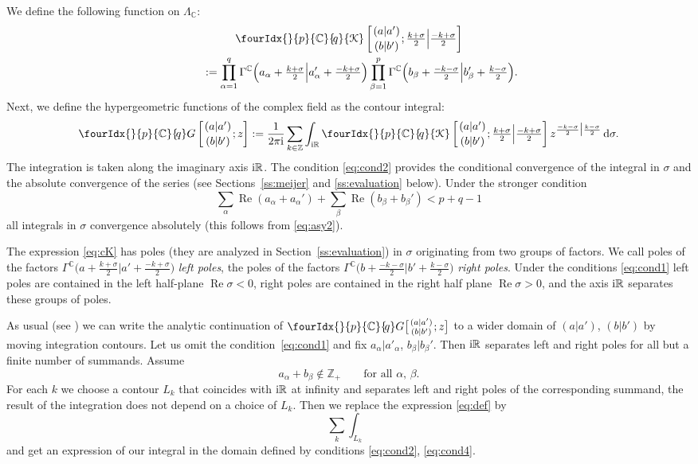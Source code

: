 \documentclass[pdftex]{sigma}
\numberwithin{equation}{section}
\renewcommand{\Re}{\mathop {\mathrm {Re}}\nolimits}
\newcommand{\Kc}[2]{\fourIdx{}{#1}{\C}{\!#2}{\EuScript K}}
\newcommand{\Gc}[2]{\fourIdx{}{#1}{\C}{\!#2}G}
\renewcommand{\Re}{\mathop {\mathrm {Re}}\nolimits}
\def\R {{\mathbb R }}
\def\C {{\mathbb C }}
\def\Z{{\mathbb Z}}
\begin{document}
We define the following function on $\Lambda_\C$:
\begin{gather}
\Kc{p}{q}\left[\genfrac{}{}{0pt}{}{(a|a')}{(b|b')};  \tfrac{k+\sigma}{2}\Bigl| \tfrac{-k+\sigma}{2}
\right]\nonumber\\
\qquad{} :=
 \prod_{\alpha=1}^q \Gamma^\C\Bigl(a_\alpha+\tfrac{k+\sigma}2\Bigl|a_\alpha'+\tfrac{-k+\sigma}2\Bigr)
 \prod_{\beta=1}^p \Gamma^\C\Bigl(b_\beta+\tfrac{-k-\sigma}2\Bigl|b_\beta'+\tfrac{k-\sigma}2\Bigr).
\label{eq:cK}
\end{gather}
Next, we define the hypergeometric functions of the complex field
as the contour integral:
\begin{equation}
\Gc{p}{q}\left[\genfrac{}{}{0pt}{}{(a|a')}{(b|b')};z\right]
:=\frac{1}{2\pi {\rm i}}
\sum_{k\in\Z} \int_{{\rm i}\R}
\Kc{p}{q}\left[\genfrac{}{}{0pt}{}{(a|a')}{(b|b')};\tfrac{k+\sigma}{2}\Bigl| \tfrac{-k+\sigma}{2}\right]
 z^{\frac{-k-\sigma}2\big| \frac{k-\sigma}2} \,{\rm d}\sigma.
 \label{eq:def}
\end{equation}
The integration is taken along the imaginary axis ${\rm i}\R$.
The condition \eqref{eq:cond2} provides the conditional convergence of
the integral in $\sigma$ and the absolute convergence of the series
(see Sections~\ref{ss:meijer} and \ref{ss:evaluation} below).
Under the stronger condition
\begin{equation}
\sum_\alpha \Re(a_\alpha+a_\alpha')+\sum_\beta\Re(b_\beta+b_\beta')<p+q-1
 \label{eq:cond3}
\end{equation}
all integrals in $\sigma$ convergence absolutely
(this follows from \eqref{eq:asy2}).

The expression \eqref{eq:cK} has poles (they are analyzed in
Section~\ref{ss:evaluation}) in $\sigma$ originating from two groups
of factors.
We call poles of the factors
$\Gamma^\C\big(a+\frac{k+\sigma}2\big|a'+\frac{-k+\sigma}2\big)$
\emph{left poles}, the poles of the factors
$\Gamma^\C\big(b+\frac{-k-\sigma}2\big|b'+\frac{k-\sigma}2\big)$
\emph{right poles}.
Under the conditions \eqref{eq:cond1} left poles are contained
in the left half-plane $\Re\sigma<0$,
right poles are contained in the right half plane $\Re\sigma>0$, and
the axis ${\rm i}\R$ separates these groups of poles.

As usual (see \cite{Sla}) we can write the analytic continuation of
$\Gc{p}{q}\big[\genfrac{}{}{0pt}{}{(a|a')}{(b|b')};z\big]$
to a wider domain of $(a|a')$, $(b|b')$ by moving integration contours.
Let us omit the condition~\eqref{eq:cond1} and fix
$a_\alpha|a'_\alpha$, $b_\beta|b_\beta'$.
Then ${\rm i}\R$ separates left and right poles for all but a finite number of
summands.
Assume
\begin{equation}
a_\alpha+b_\beta\notin\Z_+ \qquad\text{for all $\alpha$, $\beta$.}
\label{eq:cond4}
\end{equation}
For each $k$ we choose a contour $L_k$ that coincides with ${\rm i}\R$ at infinity
and separates left and right poles of the corresponding summand,
the result of the integration does not depend on a choice of $L_k$.
Then we replace the expression \eqref{eq:def} by
\[
\sum_k \int_{L_k}
\]
and get an expression of our integral in the domain
defined by conditions \eqref{eq:cond2}, \eqref{eq:cond4}.
\end{document}
